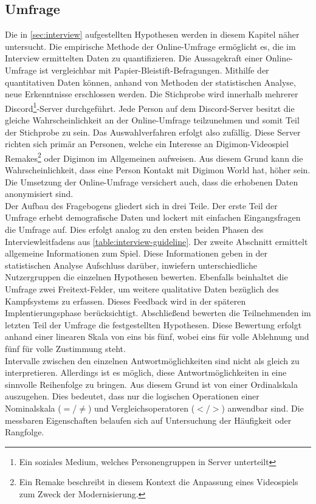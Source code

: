 \subsection{Umfrage}\label{sec:survey}
Die in \autoref{sec:interview} aufgestellten Hypothesen werden in diesem Kapitel näher untersucht.
Die empirische Methode der Online-Umfrage\cite{value-online-survey} ermöglicht es, die im Interview ermittelten Daten zu quantifizieren.
Die Aussagekraft einer Online-Umfrage ist vergleichbar mit Papier-Bleistift-Befragungen\cite{online-marktforschung}.
Mithilfe der quantitativen Daten können, anhand von Methoden der statistischen Analyse, neue Erkenntnisse erschlossen werden.
Die Stichprobe wird innerhalb mehrerer Discord\footnote{Ein soziales Medium, welches Personengruppen in Server unterteilt\cite{discord}}-Server durchgeführt.
Jede Person auf dem Discord-Server besitzt die gleiche Wahrscheinlichkeit an der Online-Umfrage teilzunehmen und somit Teil der Stichprobe zu sein.
Das Auswahlverfahren erfolgt also zufällig.
Diese Server richten sich primär an Personen, welche ein Interesse an Digimon-Videospiel Remakes\footnote{Ein Remake beschreibt in diesem Kontext die Anpassung eines Videospiels zum Zweck der Modernisierung.} oder Digimon im Allgemeinen aufweisen.
Aus diesem Grund kann die Wahrscheinlichkeit, dass eine Person Kontakt mit Digimon World hat, höher sein.
Die Umsetzung der Online-Umfrage versichert auch, dass die erhobenen Daten anonymisiert sind.\\

Der Aufbau des Fragebogens gliedert sich in drei Teile.
Der erste Teil der Umfrage erhebt demografische Daten und lockert mit einfachen Eingangsfragen die Umfrage auf.
Dies erfolgt analog zu den ersten beiden Phasen des Interviewleitfadens aus \autoref{table:interview-guideline}.
Der zweite Abschnitt ermittelt allgemeine Informationen zum Spiel.
Diese Informationen geben in der statistischen Analyse Aufschluss darüber, inwiefern unterschiedliche Nutzergruppen die einzelnen Hypothesen bewerten.
Ebenfalls beinhaltet die Umfrage zwei Freitext-Felder, um weitere qualitative Daten bezüglich des Kampfsystems zu erfassen.
Dieses Feedback wird in der späteren Implentierungsphase berücksichtigt.
Abschließend bewerten die Teilnehmenden im letzten Teil der Umfrage die festgestellten Hypothesen.
Diese Bewertung erfolgt anhand einer linearen Skala von eins bis fünf, wobei eins für volle Ablehnung und fünf für volle Zustimmung steht.  \\

Intervalle zwischen den einzelnen Antwortmöglichkeiten sind nicht als gleich zu interpretieren.
Allerdings ist es möglich, diese Antwortmöglichkeiten in eine sinnvolle Reihenfolge zu bringen.
Aus diesem Grund ist von einer Ordinalskala auszugehen\cite[S.11]{elementare-stochastik}.
Dies bedeutet, dass nur die logischen Operationen einer Nominalskala ($=$/$\neq$) und Vergleichsoperatoren ($<$/$>$) anwendbar sind.
Die messbaren Eigenschaften belaufen sich auf Untersuchung der Häufigkeit oder Rangfolge.\\

